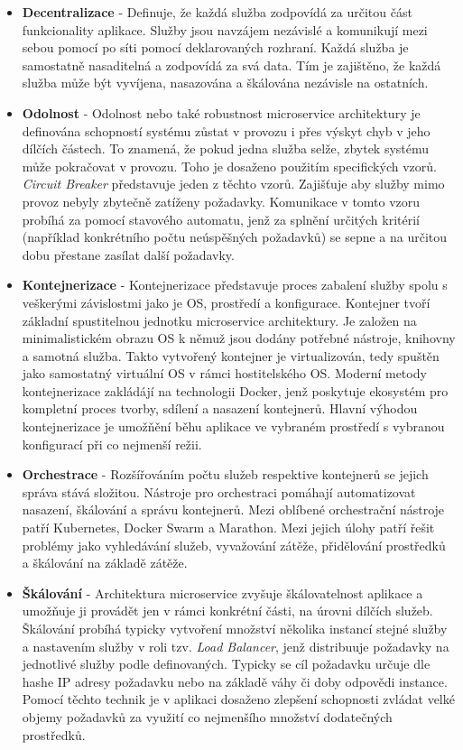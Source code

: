 \begin{itemize}
    \item \textbf{Decentralizace} - Definuje, že každá služba zodpovídá za určitou část funkcionality aplikace. Služby jsou navzájem nezávislé a komunikují mezi sebou pomocí po síti pomocí deklarovaných rozhraní. Každá služba je samostatně nasaditelná a zodpovídá za svá data. \cite{Gammelgaard2021} Tím je zajištěno, že každá služba může být vyvíjena, nasazována a škálována nezávisle na ostatních.
    \item \textbf{Odolnost} - Odolnost nebo také robustnost microservice architektury je definována schopností systému zůstat v provozu i přes výskyt chyb v jeho dílčích částech. To znamená, že pokud jedna služba selže, zbytek systému může pokračovat v provozu. Toho je dosaženo použitím specifických vzorů. \emph{Circuit Breaker} představuje jeden z těchto vzorů. Zajišťuje aby služby mimo provoz nebyly zbytečně zatíženy požadavky. Komunikace v tomto vzoru probíhá za pomocí stavového automatu, jenž za splnění určitých kritérií (například konkrétního počtu neúspěšných požadavků) se sepne a na určitou dobu přestane zasílat další požadavky. \cite{Gammelgaard2021}
    \item \textbf{Kontejnerizace} - Kontejnerizace představuje proces zabalení služby spolu s veškerými závislostmi jako je OS, prostředí a konfigurace. Kontejner tvoří základní spustitelnou jednotku microservice architektury. Je založen na minimalistickém obrazu OS k němuž jsou dodány potřebné nástroje, knihovny a samotná služba. Takto vytvořený kontejner je virtualizován, tedy spuštěn jako samostatný virtuální OS v rámci hostitelského OS. \cite{dockerdocs} Moderní metody kontejnerizace zakládájí na technologii Docker, jenž poskytuje ekosystém pro kompletní proces tvorby, sdílení a nasazení kontejnerů. Hlavní výhodou kontejnerizace je umožňění běhu aplikace ve vybraném prostředí s vybranou konfigurací při co nejmenší režii.
    \item \textbf{Orchestrace} - Rozšířováním počtu služeb respektive kontejnerů se jejich správa stává složitou. Nástroje pro orchestraci pomáhají automatizovat nasazení, škálování a správu kontejnerů. Mezi oblíbené orchestrační nástroje patří Kubernetes, Docker Swarm a Marathon. \cite{Williams2023} Mezi jejich úlohy patří řešit problémy jako vyhledávání služeb, vyvažování zátěže, přidělování prostředků a škálování na základě zátěže.
    \item \textbf{Škálování} - Architektura microservice zvyšuje škálovatelnost aplikace a umožňuje ji provádět jen v rámci konkrétní části, na úrovni dílčích služeb. Škálování probíhá typicky vytvoření množství několika instancí stejné služby a nastavením služby v roli tzv. \emph{Load Balancer}, jenž distribuuje požadavky na jednotlivé služby podle definovaných. Typicky se cíl požadavku určuje dle hashe IP adresy požadavku nebo na základě váhy či doby odpovědi instance. Pomocí těchto technik je v aplikaci dosaženo zlepšení schopnosti zvládat velké objemy požadavků za využití co nejmenšího množství dodatečných prostředků. \cite{Gammelgaard2021}
\end{itemize}

